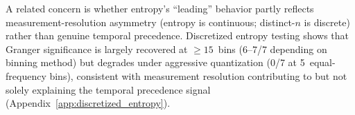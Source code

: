 A related concern is whether entropy's ``leading'' behavior partly reflects measurement-resolution asymmetry (entropy is continuous; distinct-$n$ is discrete) rather than genuine temporal precedence.
Discretized entropy testing shows that Granger significance is largely recovered at ${\geq}15$~bins (6--7/7 depending on binning method) but degrades under aggressive quantization (0/7 at 5~equal-frequency bins), consistent with measurement resolution contributing to but not solely explaining the temporal precedence signal (Appendix~\ref{app:discretized_entropy}).
